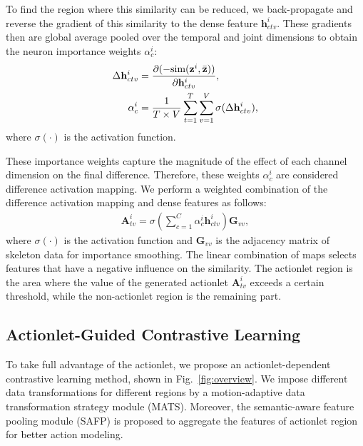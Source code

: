 \documentclass[twocolumn]{article}
\newcommand{\wh}[1]{\textcolor{black}{#1}}
\begin{document}
To find the region where this similarity can be reduced, we back-propagate and reverse the gradient of this similarity to the dense feature $\mathbf{h}^i_{ctv}$. 
These gradients then are global average pooled over the temporal and joint dimensions to obtain the neuron importance weights $\alpha^i_c$:
\begin{equation}
    \label{equ:sim}
    \begin{aligned}
    \Delta \mathbf{h}^i_{ctv} & = \frac{\partial (-\text{sim}(\mathbf{z}^i, \Bar{\mathbf{z}}))}{\partial \mathbf{h}^i_{ctv}},\\
    \alpha^i_c &= \frac{1}{T \times V} \sum_{t=1}^T \sum_{v=1}^V \sigma (\Delta \mathbf{h}^i_{ctv}),
    \end{aligned}
\end{equation}
where $\sigma(\cdot)$ is the activation function.

These importance weights capture the magnitude of the effect of each channel dimension on the final difference. Therefore, these weights $\alpha^i_c$ are considered difference activation mapping. 
We perform a weighted combination of the difference activation mapping and dense features as follows:
\begin{equation}
    \label{equ:wc}
    \begin{aligned}
    \mathbf{A}^i_{tv} = \sigma\left(\sum_{c=1}^C \alpha^i_c \mathbf{h}^i_{ctv}\right) \mathbf{G}_{vv},
    \end{aligned}
\end{equation}
where $\sigma(\cdot)$ is the activation function and $\mathbf{G}_{vv}$ is the adjacency matrix of skeleton data for importance smoothing. The linear combination of maps selects features that have a negative influence on the similarity. The actionlet region is the area where the value of the
generated actionlet $\mathbf{A}^i_{tv}$ exceeds a certain threshold, while the
non-actionlet region is the remaining part.




\subsection{Actionlet-Guided Contrastive Learning}

To take full advantage of the actionlet, we propose an actionlet-dependent contrastive learning method, shown in Fig.~\ref{fig:overview}.
We impose different data transformations for different regions by a motion-adaptive data transformation strategy module (MATS). 
Moreover, the semantic-aware feature pooling module (SAFP) is proposed to aggregate the features of actionlet region for \wh{better} action modeling.
\vspace{1mm}
\end{document}
